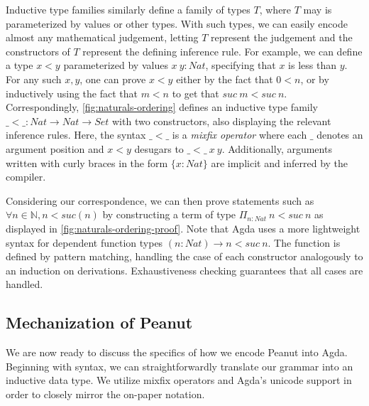 Inductive type families similarly define a family of types $T$, where $T$ may is parameterized by values or other types. With such types, we can easily encode almost any mathematical judgement, letting $T$ represent the judgement and the constructors of $T$ represent the defining inference rule. For example, we can define a type $x < y$ parameterized by values $x~y : Nat$, specifying that $x$ is less than $y$. For any such $x, y$, one can prove $x < y$ either by the fact that $0 < n$, or by inductively using the fact that $m < n$ to get that $suc~m < suc~n$. Correspondingly, \autoref{fig:naturals-ordering} defines an inductive type family $\_{<}\_ : Nat \to Nat \to Set$ with two constructors, also displaying the relevant inference rules. Here, the syntax $\_{<}\_$ is a \emph{mixfix operator} where each $\_$ denotes an argument position and $x < y$ desugars to $\_{<}\_~x~y$. Additionally, arguments written with curly braces in the form $\{x : Nat\}$ are implicit and inferred by the compiler.



\pagebreak

Considering our correspondence, we can then prove statements such as $\forall n \in \mathbb{N}, n < suc(n)$ by constructing a term of type $\Pi_{n : Nat}~n < suc~n$ as displayed in \autoref{fig:naturals-ordering-proof}. Note that Agda uses a more lightweight syntax for dependent function types $(n : Nat) \to  n < suc~n$.  The function is defined by pattern matching, handling the case of each constructor analogously to an induction on derivations. Exhaustiveness checking guarantees that all cases are handled.



\subsection{Mechanization of Peanut}\label{sec:mech-details}
We are now ready to discuss the specifics of how we encode Peanut into Agda. Beginning with syntax, we can straightforwardly translate our grammar into an inductive data type. We utilize mixfix operators and Agda's unicode support in order to closely mirror the on-paper notation.






